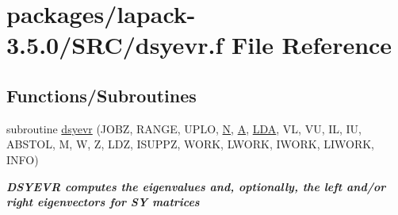 \hypertarget{dsyevr_8f}{}\section{packages/lapack-\/3.5.0/\+S\+R\+C/dsyevr.f File Reference}
\label{dsyevr_8f}
\subsection*{Functions/\+Subroutines}
\begin{DoxyCompactItemize}
\item 
subroutine \hyperlink{group__doubleSYeigen_gaeed8a131adf56eaa2a9e5b1e0cce5718}{dsyevr} (J\+O\+B\+Z, R\+A\+N\+G\+E, U\+P\+L\+O, \hyperlink{polmisc_8c_a0240ac851181b84ac374872dc5434ee4}{N}, \hyperlink{classA}{A}, \hyperlink{example__user_8c_ae946da542ce0db94dced19b2ecefd1aa}{L\+D\+A}, V\+L, V\+U, I\+L, I\+U, A\+B\+S\+T\+O\+L, M, W, Z, L\+D\+Z, I\+S\+U\+P\+P\+Z, W\+O\+R\+K, L\+W\+O\+R\+K, I\+W\+O\+R\+K, L\+I\+W\+O\+R\+K, I\+N\+F\+O)
\begin{DoxyCompactList}\small\item\em {\bfseries  D\+S\+Y\+E\+V\+R computes the eigenvalues and, optionally, the left and/or right eigenvectors for S\+Y matrices} \end{DoxyCompactList}\end{DoxyCompactItemize}
